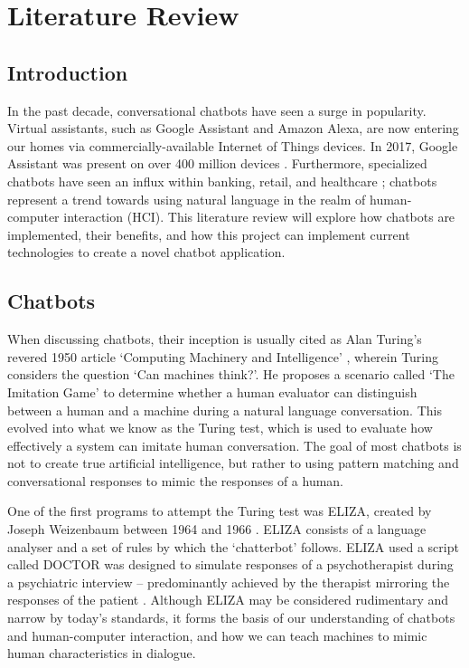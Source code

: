 \chapter{Literature Review}
\label{ch:lit}
\section{Introduction}
In the past decade, conversational chatbots have seen a surge in popularity. Virtual assistants, such as Google Assistant and Amazon Alexa, are now entering our homes via commercially-available Internet of Things devices. In 2017, Google Assistant was present on over 400 million devices \cite{chandra2018}. Furthermore, specialized chatbots have seen an influx within banking, retail, and healthcare \cite{gvr2017}; chatbots represent a trend towards using natural language in the realm of human-computer interaction (HCI).  This literature review will explore how chatbots are implemented, their benefits, and how this project can implement current technologies to create a novel chatbot application.

\section{Chatbots}
When discussing chatbots, their inception is usually cited as Alan Turing’s revered 1950 article `Computing Machinery and Intelligence' \cite{turing1950computing}, wherein Turing considers the question `Can machines think?'. He proposes a scenario called `The Imitation Game' to determine whether a human evaluator can distinguish between a human and a machine during a natural language conversation. This evolved into what we know as the Turing test, which is used to evaluate how effectively a system can imitate human conversation. The goal of most chatbots is not to create true artificial intelligence, but rather to using pattern matching and conversational responses to mimic the responses of a human.

One of the first programs to attempt the Turing test was ELIZA, created by Joseph Weizenbaum between 1964 and 1966 \cite{weizenbaum1976computer}. ELIZA consists of a language analyser and a set of rules by which the `chatterbot' follows. ELIZA used a script called DOCTOR was designed to simulate responses of a psychotherapist during a psychiatric interview – predominantly achieved by the therapist mirroring the responses of the patient  \cite{weizenbaum1976computer}. Although ELIZA may be considered rudimentary and narrow by today’s standards, it forms the basis of our understanding of chatbots and human-computer interaction, and how we can teach machines to mimic human characteristics in dialogue.

